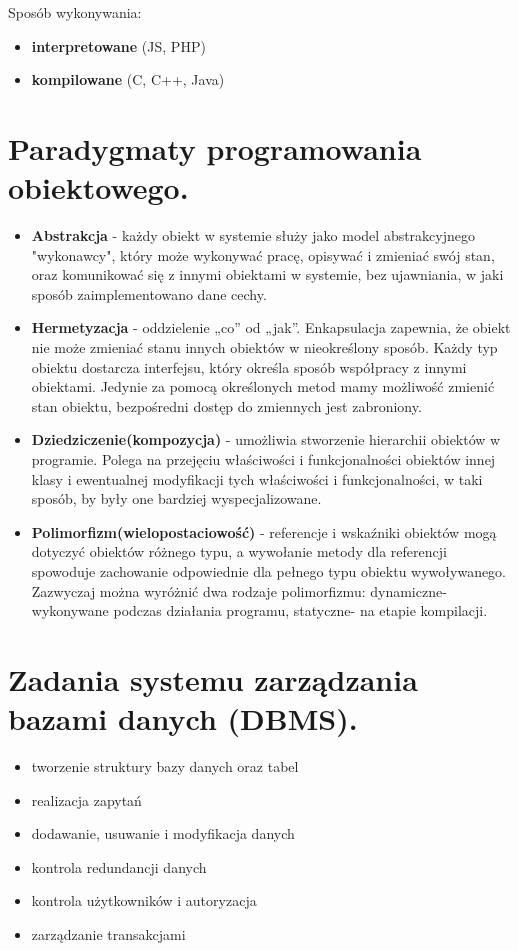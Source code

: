 \documentclass[12pt,a4paper]{article}
\begin{document}
	Sposób wykonywania:
		\begin{itemize}
			\item \textbf{interpretowane} (JS, PHP)
			\item \textbf{kompilowane} (C, C++, Java)
		\end{itemize}

	\section{Paradygmaty programowania obiektowego.}
	\begin{itemize}
		\item \textbf{Abstrakcja} - każdy obiekt w systemie służy jako model abstrakcyjnego "wykonawcy", który może wykonywać pracę, opisywać i zmieniać swój stan, oraz komunikować się z innymi obiektami w systemie, bez ujawniania, w jaki sposób zaimplementowano dane cechy.
		
		\item \textbf{Hermetyzacja} - oddzielenie „co” od „jak”. Enkapsulacja zapewnia, że obiekt nie może zmieniać stanu innych obiektów w nieokreślony sposób. Każdy typ obiektu dostarcza interfejsu, który określa sposób współpracy z innymi obiektami. Jedynie za pomocą określonych metod mamy możliwość zmienić stan obiektu, bezpośredni dostęp do zmiennych jest zabroniony.
		
		\item \textbf{Dziedziczenie(kompozycja)} - umożliwia stworzenie hierarchii obiektów w programie. Polega na przejęciu właściwości i funkcjonalności obiektów innej klasy i ewentualnej modyfikacji tych właściwości i funkcjonalności, w taki sposób, by były one bardziej wyspecjalizowane.
		
		\item \textbf{Polimorfizm(wielopostaciowość)} - referencje i wskaźniki obiektów mogą dotyczyć obiektów różnego typu, a wywołanie metody dla referencji spowoduje zachowanie odpowiednie dla pełnego typu obiektu wywoływanego. Zazwyczaj można wyróżnić dwa rodzaje polimorfizmu: dynamiczne- wykonywane podczas działania programu, statyczne- na etapie kompilacji.
	\end{itemize}

	\section{Zadania systemu zarządzania bazami danych (DBMS).}
	\begin{itemize}
		\item tworzenie struktury bazy danych oraz tabel
		\item realizacja zapytań
		\item dodawanie, usuwanie i modyfikacja danych
		\item kontrola redundancji danych
		\item kontrola użytkowników i autoryzacja
		\item zarządzanie transakcjami
	\end{itemize}
\end{document}
